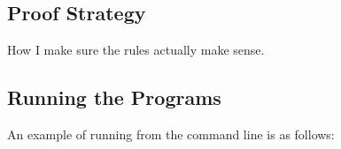 \documentclass{l4proj}
\begin{document}
\section{Proof Strategy}
How I make sure the rules actually make sense. 


\begin{appendices}

\chapter{Running the Programs}
An example of running from the command line is as follows:
\begin{verbatim}
\end{verbatim}

\end{appendices}




\end{document}
